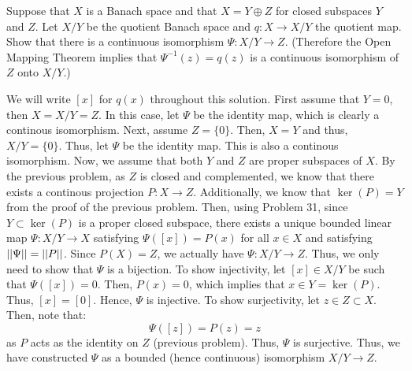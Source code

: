 \documentclass[12pt]{article}
\begin{document}
\begin{problem}{3}
    Suppose that $X$ is a Banach space and that $X = Y \oplus Z$ for closed subspaces $Y$ and $Z$. Let $X/Y$ be the quotient Banach space and $q : X \to X/Y$ the quotient map. Show that there is a continuous isomorphism $\Psi : X/Y \to Z$. (Therefore the Open Mapping Theorem implies that $\Psi^{-1}(z) = q(z)$ is a continuous isomorphism of $Z$ onto $X/Y$.)
\end{problem}
\begin{solution}
    We will write $[x]$ for $q(x)$ throughout this solution. \bbni
    First assume that $Y = 0$, then $X = X/Y = Z$. In this case, let $\Psi$ be the identity map, which is clearly a continous isomorphism. Next, assume $Z = \{0\}$. Then, $X = Y$ and thus, $X/Y = \{0\}$. Thus, let $\Psi$ be the identity map. This is also a continous isomorphism. \bbni
    Now, we assume that both $Y$ and $Z$ are proper subspaces of $X$. By the previous problem, as $Z$ is closed and complemented, we know that there exists a continous projection $P: X \to Z$. Additionally, we know that $\ker(P) = Y$ from the proof of the previous problem.  \bbni
    Then, using Problem 31, since $Y \subset \ker(P)$ is a proper closed subspace, there exists a unique bounded linear map $\Psi: X/Y \to X$ satisfying $\Psi([x]) = P(x)$ for all $x \in X$ and satisfying $\left\vert\left\vert\Psi\right\vert\right\vert = \left\vert\left\vert P\right\vert\right\vert$. Since $P(X) = Z$, we actually have $\Psi: X/Y \to Z$. Thus, we only need to show that $\Psi$ is a bijection. \bbni
    To show injectivity, let $[x]\in X/Y$ be such that $\Psi([x]) = 0$. Then, $P(x) = 0$, which implies that $x \in Y = \ker(P)$. Thus, $[x] = [0]$. Hence, $\Psi$ is injective. \bbni
    To show surjectivity, let $z \in Z \subset X$. Then, note that: 
    \[ \Psi([z]) = P(z) = z\]
    as $P$ acts as the identity on $Z$ (previous problem). Thus, $\Psi$ is surjective. \bbni
    Thus, we have constructed $\Psi$ as a bounded (hence continuous) isomorphism $X/Y \to Z$.
\end{solution}
\newpage
\end{document}
